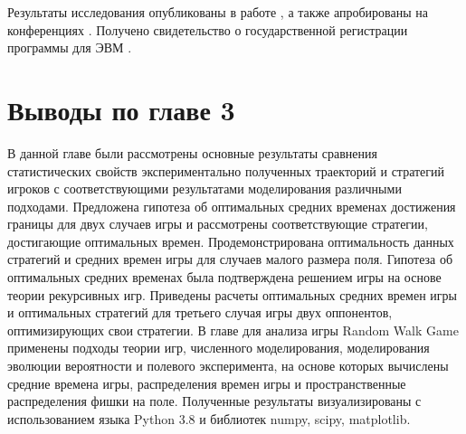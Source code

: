 Результаты исследования опубликованы в работе \cite{bib4}, а также апробированы на конференциях \cite{confbib2,confbib3}. Получено свидетельство о государственной регистрации программы для ЭВМ \cite{progbib2}.
 

\section{Выводы по главе 3}\label{sec:ch3/sec6}

В данной главе были рассмотрены основные результаты сравнения статистических свойств экспериментально полученных траекторий и стратегий игроков с соответствующими результатами моделирования различными подходами. Предложена гипотеза об оптимальных средних временах достижения границы для двух случаев игры и рассмотрены соответствующие стратегии, достигающие оптимальных времен. Продемонстрирована оптимальность данных стратегий и средних времен игры для случаев малого размера поля. Гипотеза об оптимальных средних временах была подтверждена решением игры на основе теории рекурсивных игр. Приведены расчеты оптимальных средних времен игры и оптимальных стратегий для третьего случая игры двух оппонентов, оптимизирующих свои стратегии. В главе для анализа игры Random Walk Game применены подходы теории игр, численного моделирования, моделирования эволюции вероятности и полевого эксперимента, на основе которых вычислены средние времена игры, распределения времен игры и пространственные распределения фишки на поле. Полученные результаты визуализированы с использованием языка Python 3.8 и библиотек numpy, scipy, matplotlib. 